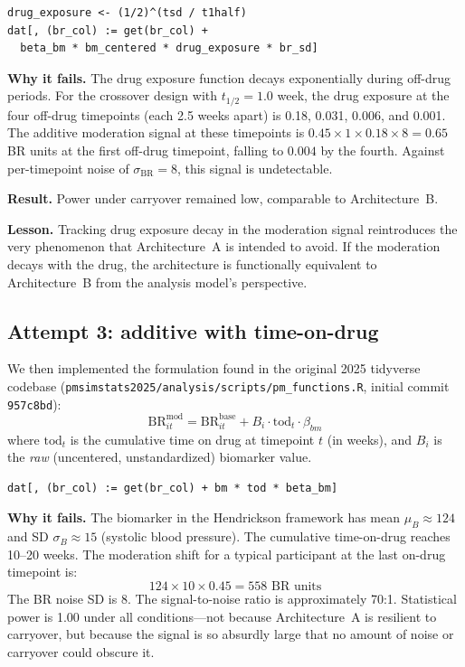 \documentclass[11pt]{article}
\begin{document}
\begin{lstlisting}
drug_exposure <- (1/2)^(tsd / t1half)
dat[, (br_col) := get(br_col) +
  beta_bm * bm_centered * drug_exposure * br_sd]
\end{lstlisting}

\textbf{Why it fails.} The drug exposure function decays
exponentially during off-drug periods. For the crossover
design with $t_{1/2} = 1.0$ week, the drug exposure at the
four off-drug timepoints (each 2.5 weeks apart) is 0.18,
0.031, 0.006, and 0.001. The additive moderation signal at
these timepoints is $0.45 \times 1 \times 0.18 \times 8 =
0.65$ BR units at the first off-drug timepoint, falling to
$0.004$ by the fourth. Against per-timepoint noise of
$\sigma_{\text{BR}} = 8$, this signal is undetectable.

\textbf{Result.} Power under carryover remained low,
comparable to Architecture~B.

\textbf{Lesson.} Tracking drug exposure decay in the
moderation signal reintroduces the very phenomenon that
Architecture~A is intended to avoid. If the moderation
decays with the drug, the architecture is functionally
equivalent to Architecture~B from the analysis model's
perspective.

\subsection{Attempt 3: additive with time-on-drug}

We then implemented the formulation found in the original
2025 tidyverse codebase
(\texttt{pmsimstats2025/analysis/scripts/pm\_functions.R},
initial commit \texttt{957c8bd}):
%
\begin{equation}
  \text{BR}_{it}^{\text{mod}} = \text{BR}_{it}^{\text{base}}
  + B_i \cdot \text{tod}_t \cdot \beta_{bm}
\end{equation}
%
where $\text{tod}_t$ is the cumulative time on drug at
timepoint $t$ (in weeks), and $B_i$ is the \emph{raw}
(uncentered, unstandardized) biomarker value.

\begin{lstlisting}
dat[, (br_col) := get(br_col) + bm * tod * beta_bm]
\end{lstlisting}

\textbf{Why it fails.} The biomarker in the Hendrickson
framework has mean $\mu_B \approx 124$ and SD
$\sigma_B \approx 15$ (systolic blood pressure). The
cumulative time-on-drug reaches 10--20 weeks. The moderation
shift for a typical participant at the last on-drug timepoint
is:
%
\begin{equation}
  124 \times 10 \times 0.45 = 558 \text{ BR units}
\end{equation}
%
The BR noise SD is 8. The signal-to-noise ratio is
approximately 70:1. Statistical power is 1.00 under all
conditions---not because Architecture~A is resilient to
carryover, but because the signal is so absurdly large that
no amount of noise or carryover could obscure it.
\end{document}
